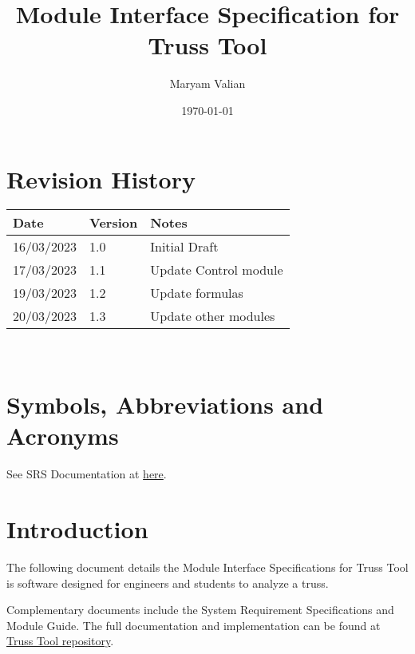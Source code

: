 \documentclass[12pt, titlepage]{article}
\begin{document}
\title{Module Interface Specification for Truss Tool}

\author{Maryam Valian}

\date{\today}

\maketitle


\section{Revision History}

\begin{tabularx}{\textwidth}{p{3cm}p{2cm}X}
\toprule {\bf Date} & {\bf Version} & {\bf Notes}\\
\midrule
16/03/2023 & 1.0 & Initial Draft\\
17/03/2023 & 1.1 & Update Control module\\
19/03/2023 & 1.2 & Update formulas\\
20/03/2023 & 1.3 & Update other modules\\
\bottomrule
\end{tabularx}

~\newpage

\section{Symbols, Abbreviations and Acronyms}

See SRS Documentation at \href{https://github.com/Maryamvalian/project741/blob/main/docs/SRS/SRS.pdf}{here}. 
\newpage

\tableofcontents

\newpage


\section{Introduction}

The following document details the Module Interface Specifications for
Truss Tool is software designed for engineers and students to analyze a truss.

Complementary documents include the System Requirement Specifications
and Module Guide.  The full documentation and implementation can be
found at \href{https://github.com/Maryamvalian/project741}{Truss Tool repository}.
\end{document}
